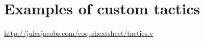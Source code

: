 \section{Examples of custom tactics}


\url{http://julesjacobs.com/coq-cheatsheet/tactics.v}








